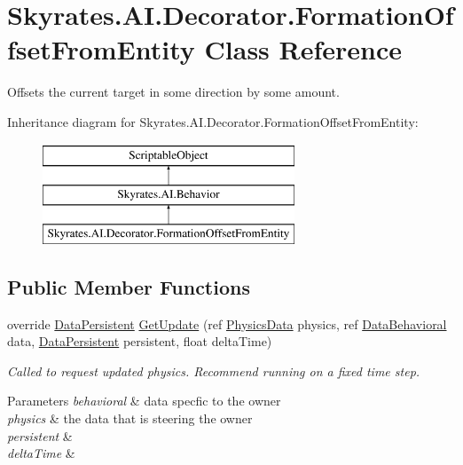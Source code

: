 \hypertarget{class_skyrates_1_1_a_i_1_1_decorator_1_1_formation_offset_from_entity}{\section{Skyrates.\-A\-I.\-Decorator.\-Formation\-Offset\-From\-Entity Class Reference}
\label{class_skyrates_1_1_a_i_1_1_decorator_1_1_formation_offset_from_entity}
}


Offsets the current target in some direction by some amount.  


Inheritance diagram for Skyrates.\-A\-I.\-Decorator.\-Formation\-Offset\-From\-Entity\-:\begin{figure}[H]
\begin{center}
\leavevmode
\includegraphics[height=3.000000cm]{class_skyrates_1_1_a_i_1_1_decorator_1_1_formation_offset_from_entity}
\end{center}
\end{figure}
\subsection*{Public Member Functions}
\begin{DoxyCompactItemize}
\item 
\hypertarget{class_skyrates_1_1_a_i_1_1_decorator_1_1_formation_offset_from_entity_a875633f956985b4291bd2079f56240ee}{override \hyperlink{class_skyrates_1_1_a_i_1_1_behavior_1_1_data_persistent}{Data\-Persistent} \hyperlink{class_skyrates_1_1_a_i_1_1_decorator_1_1_formation_offset_from_entity_a875633f956985b4291bd2079f56240ee}{Get\-Update} (ref \hyperlink{class_skyrates_1_1_physics_1_1_physics_data}{Physics\-Data} physics, ref \hyperlink{class_skyrates_1_1_a_i_1_1_behavior_1_1_data_behavioral}{Data\-Behavioral} data, \hyperlink{class_skyrates_1_1_a_i_1_1_behavior_1_1_data_persistent}{Data\-Persistent} persistent, float delta\-Time)}\label{class_skyrates_1_1_a_i_1_1_decorator_1_1_formation_offset_from_entity_a875633f956985b4291bd2079f56240ee}

\begin{DoxyCompactList}\small\item\em Called to request updated physics. Recommend running on a fixed time step. 


\begin{DoxyParams}{Parameters}
{\em behavioral} & data specfic to the owner\\
\hline
{\em physics} & the data that is steering the owner\\
\hline
{\em persistent} & \\
\hline
{\em delta\-Time} & \\
\hline
\end{DoxyParams}
 \end{DoxyCompactList}\end{DoxyCompactItemize}
